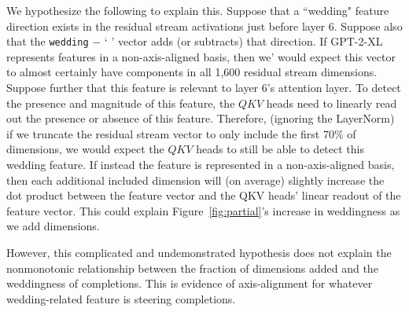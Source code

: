 We hypothesize the following to explain this. Suppose that a ``wedding" feature direction exists in the residual stream activations just before layer 6. Suppose also that the \texttt{wedding} $-$ `\,\,' vector adds (or subtracts) that direction. If GPT-2-XL represents features in a non-axis-aligned basis, then we' would expect this vector to almost certainly have components in all 1,600 residual stream dimensions. Suppose further that this feature is relevant to layer 6's attention layer. To detect the presence and magnitude of this feature, the $QKV$ heads need to linearly read out the presence or absence of this feature. Therefore, (ignoring the LayerNorm) if we truncate the residual stream vector to only include the first 70\% of dimensions, we would expect the $QKV$ heads to still be able to detect this wedding feature. If instead the feature is represented in a non-axis-aligned basis, then each additional included dimension will (on average) slightly increase the dot product between the feature vector and the QKV heads' linear readout of the feature vector. This could explain Figure~\ref{fig:partial}'s increase in weddingness as we add dimensions.  

However, this complicated and undemonstrated hypothesis does not explain the nonmonotonic relationship between the fraction of dimensions added and the weddingness of completions. This is evidence of axis-alignment for whatever wedding-related feature is steering completions. %






